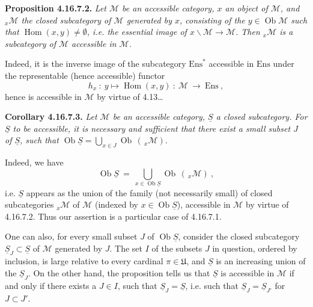 \documentclass[11pt]{article}
\newcommand{\printedpage}[1]{\marginpar{\footnotesize p.~#1}}
\newcommand{\msp}[1]{\marginpar{\footnotesize [#1]}}
\newcommand{\Ob}{\operatorname{Ob}}
\newcommand{\Hom}{\operatorname{Hom}}
\newcommand{\cM}{\mathcal{M}}
\newcommand{\uS}{\underline{S}}
\newcommand{\U}{\mathfrak{U}}
\begin{document}
\msp{page 479}
\textbf{Proposition 4.16.7.2.} \textit{Let $\cM$ be an accessible category, $x$ an object of $\cM$, and ${}_x\cM$ the closed subcategory of $\cM$ generated by $x$, consisting of the $y \in \Ob \cM$ such that $\Hom(x,y) \neq \emptyset$, i.e. the essential image of $x\backslash\cM \longrightarrow \cM$. Then ${}_x\cM$ is a subcategory of $\cM$ accessible in $\cM$.}

Indeed, it is the inverse image of the subcategory $\mathrm{Ens}^*$ accessible in $\mathrm{Ens}$ under the representable (hence accessible) functor
\[
h_x \ :\ y \longmapsto \Hom(x,y) \ :\ \cM \ \longrightarrow\ \mathrm{Ens} \ ,
\]
hence is accessible in $\cM$ by virtue of 4.13\dots

\textbf{Corollary 4.16.7.3.} \textit{Let $\cM$ be an accessible category, $\uS$ a closed subcategory. For $\uS$ to be accessible, it is necessary and sufficient that there exist a \textup{small} subset $J$ of $\uS$, such that $\Ob \uS = \bigcup_{x\in J} \Ob\,(\,{}_x\cM)$.}

Indeed, we have
\[
\Ob \uS \ =\ \bigcup_{x\in\Ob\uS} \Ob\,(\,{}_x\cM) \ ,
\]
i.e. $\uS$ appears as the union of
\msp{page 480}
the family (not necessarily small) of closed subcategories ${}_x\cM$ of $\cM$ (indexed by $x \in \Ob \uS$), accessible in $\cM$ by virtue of 4.16.7.2. Thus our assertion is a particular case of 4.16.7.1.

\printedpage{186}

One can also, for every small subset $J$ of $\Ob \uS$, consider the closed subcategory $\uS_J \subset \uS$ of $\cM$ generated by $J$. The set $I$ of the subsets $J$ in question, ordered by inclusion, is large relative to every cardinal $\pi \in \U$, and $\uS$ is an increasing union of the $\uS_J$. On the other hand, the proposition tells us that $\uS$ is accessible in $\cM$ if and only if there exists a $J \in I$, such that $\uS_J = \uS$, i.e. such that $\uS_J = \uS_{J'}$ for $J \subset J'$.
\end{document}
